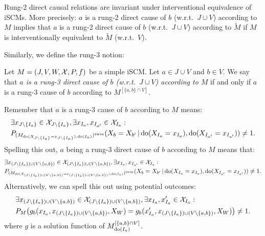 \begin{Rem}\label{rem:scm_rung2_direct_cause_of_interventional_equivalence}
  Rung-2 direct causal relations are invariant under interventional equivalence of iSCMs.
  More precisely: $a$ is a rung-2 direct cause of $b$ (w.r.t.\ $J \cup V$) according to $M$ implies that $a$ is a rung-2 direct cause of $b$ (w.r.t.\ $J \cup V$) according to $\tilde{M}$ if $M$ is interventionally equivalent to $\tilde{M}$ (w.r.t.\ $V$).
\end{Rem}
Similarly, we define the rung-3 notion:
\begin{Def}\label{def:scm_rung3_direct_cause_of}
  Let $M = \left ( J, V, W, \mathcal{X}, P, f \right )$ be a simple iSCM.
  Let $a \in J \cup V$ and $b \in V$. 
  We say that \emph{$a$ is a rung-3 direct cause of $b$ (w.r.t.\ $J \cup V$) according to $M$} if and only if $a$ is a rung-3 cause of $b$ according to $M^{[\{a,b\}\cap V]}$.
\end{Def}
\begin{Rem}\label{rem:scm_rung3_direct_cause_of}
  Remember that $a$ is a rung-3 cause of $b$ according to $M$ means:
    \begin{equation*}\begin{split}
      & \exists x_{J\setminus\{I_a\}} \in \mathcal{X}_{J\setminus\{I_a\}}, \exists x_{I_a},x_{I_{a'}} \in \mathcal{X}_{I_a}: \\
      & P_{(M_{\operatorname{do}(X_{J\setminus\{I_a\}}=x_{J\setminus\{I_a\}}),\operatorname{do}(I_a)})^{\mathrm{twin}}}(X_b = X_{b'} \operatorname*{|} \operatorname{do}(X_{I_a}=x_{I_a}),\operatorname{do}(X_{I_{a'}}=x_{I_{a'}})) \ne 1.
    \end{split}\end{equation*}
  Spelling this out, $a$ being a rung-3 direct cause of $b$ according to $M$ means that:
    \begin{equation*}\begin{split}
      & \exists x_{(J\setminus\{I_a\}) \cup (V\setminus\{a,b\})} \in \mathcal{X}_{(J\setminus\{I_a\}) \cup (V\setminus\{a,b\})}, \exists x_{I_a},x_{I_{a'}} \in \mathcal{X}_{I_a}: \\
      & P_{(M_{\operatorname{do}(X_{(J\setminus\{I_a\}) \cup (V\setminus\{a,b\})}=x_{(J\setminus\{I_a\}) \cup (V\setminus\{a,b\})}),\operatorname{do}(I_a)})^{\mathrm{twin}}}(X_b = X_{b'} \operatorname*{|} \operatorname{do}(X_{I_a}=x_{I_a}),\operatorname{do}(X_{I_{a'}}=x_{I_{a'}})) \ne 1.
    \end{split}\end{equation*}
  Alternatively, we can spell this out using potential outcomes:
    \begin{equation*}\begin{split}
      & \exists x_{(J\setminus\{I_a\}) \cup (V\setminus\{a,b\})} \in \mathcal{X}_{(J\setminus\{I_a\}) \cup (V\setminus\{a,b\})}, \exists x_{I_a},x_{I_{a}}' \in \mathcal{X}_{I_a}: \\
      & P_M\big(g_b(x_{I_a},x_{(J\setminus\{I_a\}) \cup (V\setminus\{a,b\})},X_W) = 
                g_b(x_{I_a}',x_{(J\setminus\{I_a\}) \cup (V\setminus\{a,b\})},X_W)\big) \ne 1.
    \end{split}\end{equation*}
  where $g$ is a solution function of $M^{[\{a,b\}\cap V]}_{\operatorname{do}(I_a)}$.
\end{Rem}
